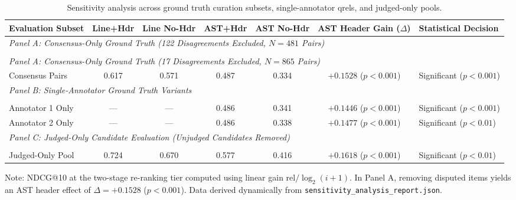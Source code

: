 \begin{table}[t]
\caption{Sensitivity analysis across ground truth curation subsets, single-annotator qrels, and judged-only pools.}
\label{tab:qrel_sensitivity}
\centering\footnotesize
\setlength{\tabcolsep}{4.5pt}
\begin{threeparttable}
\begin{tabular}{@{}lcccccl@{}}
\toprule
Evaluation Subset & Line+Hdr & Line No-Hdr & AST+Hdr & AST No-Hdr & AST Header Gain ($\Delta$) & Statistical Decision \\
\midrule
\multicolumn{7}{l}{\textit{Panel A: Consensus-Only Ground Truth (122 Disagreements Excluded, $N=481$ Pairs)}} \\\\[2pt]
\multicolumn{7}{l}{\textit{Panel A: Consensus-Only Ground Truth (17 Disagreements Excluded, $N=865$ Pairs)}} \\[2pt]
Consensus Pairs & 0.617 & 0.571 & 0.487 & 0.334 & $+0.1528$ ($p < 0.001$) & Significant ($p < 0.001$) \\[2pt]
\midrule
\multicolumn{7}{l}{\textit{Panel B: Single-Annotator Ground Truth Variants}} \\\\[2pt]
Annotator 1 Only & --- & --- & 0.486 & 0.341 & $+0.1446$ ($p < 0.001$) & Significant ($p < 0.001$) \\[2pt]
Annotator 2 Only & --- & --- & 0.486 & 0.338 & $+0.1477$ ($p < 0.001$) & Significant ($p < 0.01$) \\[2pt]
\midrule
\multicolumn{7}{l}{\textit{Panel C: Judged-Only Candidate Evaluation (Unjudged Candidates Removed)}} \\\\[2pt]
Judged-Only Pool & 0.724 & 0.670 & 0.577 & 0.416 & $+0.1618$ ($p < 0.001$) & Significant ($p < 0.01$) \\
\bottomrule
\end{tabular}
\begin{tablenotes}\footnotesize
\item[] Note: NDCG@10 at the two-stage re-ranking tier computed using linear gain $\mathrm{rel}/\log_2(i+1)$. In Panel A, removing disputed items yields an AST header effect of $\Delta = +0.1528$ ($p < 0.001$). Data derived dynamically from \texttt{sensitivity\_analysis\_report.json}.
\end{tablenotes}
\end{threeparttable}
\end{table}